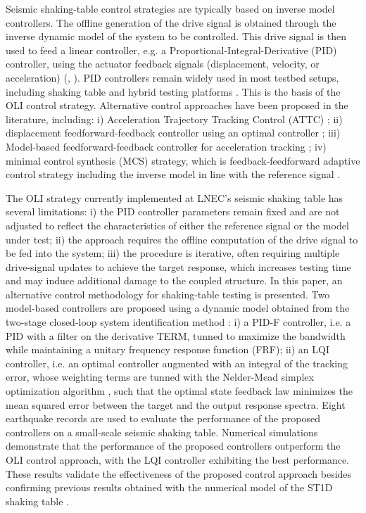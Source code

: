 \documentclass[ 10pt, twocolumn]{article} %
\begin{document}
Seismic shaking-table control strategies are typically based on inverse model controllers. The offline generation of the drive signal is obtained through the inverse dynamic model of the system to be controlled. This drive signal is then used to feed a linear controller, e.g. a Proportional-Integral-Derivative (PID) controller, using the actuator feedback signals (displacement, velocity, or acceleration) (\cite{williams2001}, \cite{henrique2026}). PID controllers remain widely used in most testbed setups, including shaking table and hybrid testing platforms \cite{tekeste2021}. This is the basis of the OLI control strategy. Alternative control approaches have been proposed in the literature, including: i) Acceleration Trajectory Tracking Control (ATTC) \cite{nakata2010}; ii) displacement feedforward-feedback controller using an optimal controller \cite{phillips2012}; iii) Model-based feedforward-feedback controller for acceleration tracking \cite{phillips2014}; iv) minimal control synthesis (MCS) strategy, which is feedback-feedforward adaptive control strategy including the inverse model in line with the reference signal \cite{stoten2001}.

The OLI strategy currently implemented at LNEC's seismic shaking table has several limitations: i) the PID controller parameters remain fixed and are not adjusted to reflect the characteristics of either the reference signal or the model under test; ii) the approach requires the offline computation of the drive signal to be fed into the system; iii) the procedure is iterative, often requiring multiple drive-signal updates to achieve the target response, which increases testing time and may induce additional damage to the coupled structure. In this paper, an alternative control methodology for shaking-table testing is presented. Two model-based controllers are proposed using a dynamic model obtained from the two-stage closed-loop system identification method \cite{vandenhof1993}: i) a PID-F controller, i.e. a PID with a filter on the derivative TERM, tunned to maximize the bandwidth while maintaining a unitary frequency response function (FRF); ii) an LQI controller, i.e. an optimal controller augmented with an integral of the tracking error, whose weighting terms are tunned with the Nelder-Mead simplex optimization algorithm \cite{lagarias1998}, such that the optimal state feedback law minimizes the mean squared error between the target and the output response spectra. Eight earthquake records \cite{narasimhan2006} are used to evaluate the performance of the proposed controllers on a small-scale seismic shaking table. Numerical simulations demonstrate that the performance of the proposed controllers outperform the OLI control approach, with the LQI controller exhibiting the best performance. These results validate the effectiveness of the proposed control approach besides confirming previous results obtained with the numerical model of the ST1D shaking table \cite{henrique2026}. 
\end{document}
